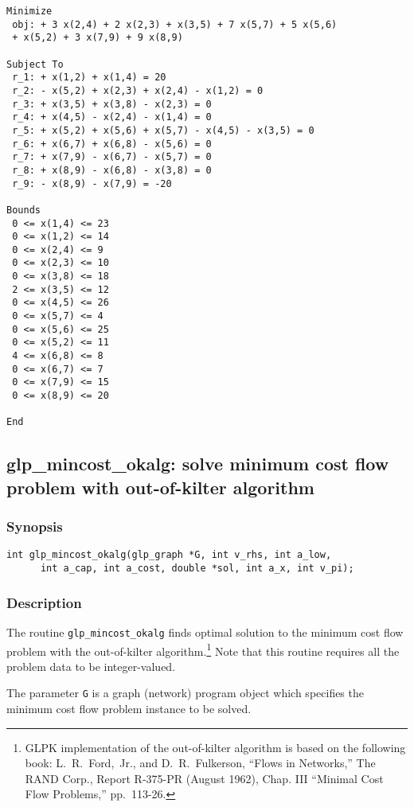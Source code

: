 \begin{verbatim}
Minimize
 obj: + 3 x(2,4) + 2 x(2,3) + x(3,5) + 7 x(5,7) + 5 x(5,6)
 + x(5,2) + 3 x(7,9) + 9 x(8,9)

Subject To
 r_1: + x(1,2) + x(1,4) = 20
 r_2: - x(5,2) + x(2,3) + x(2,4) - x(1,2) = 0
 r_3: + x(3,5) + x(3,8) - x(2,3) = 0
 r_4: + x(4,5) - x(2,4) - x(1,4) = 0
 r_5: + x(5,2) + x(5,6) + x(5,7) - x(4,5) - x(3,5) = 0
 r_6: + x(6,7) + x(6,8) - x(5,6) = 0
 r_7: + x(7,9) - x(6,7) - x(5,7) = 0
 r_8: + x(8,9) - x(6,8) - x(3,8) = 0
 r_9: - x(8,9) - x(7,9) = -20

Bounds
 0 <= x(1,4) <= 23
 0 <= x(1,2) <= 14
 0 <= x(2,4) <= 9
 0 <= x(2,3) <= 10
 0 <= x(3,8) <= 18
 2 <= x(3,5) <= 12
 0 <= x(4,5) <= 26
 0 <= x(5,7) <= 4
 0 <= x(5,6) <= 25
 0 <= x(5,2) <= 11
 4 <= x(6,8) <= 8
 0 <= x(6,7) <= 7
 0 <= x(7,9) <= 15
 0 <= x(8,9) <= 20

End
\end{verbatim}

\subsection{glp\_mincost\_okalg: solve minimum cost flow problem with
out-of-kilter algorithm}

\subsubsection*{Synopsis}

\begin{verbatim}
int glp_mincost_okalg(glp_graph *G, int v_rhs, int a_low,
      int a_cap, int a_cost, double *sol, int a_x, int v_pi);
\end{verbatim}

\subsubsection*{Description}

The routine \verb|glp_mincost_okalg| finds optimal solution to the
minimum cost flow problem with the out-of-kilter
algorithm.\footnote{GLPK implementation of the out-of-kilter algorithm
is based on the following book: L.~R.~Ford,~Jr., and D.~R.~Fulkerson,
``Flows in Networks,'' The RAND Corp., Report R-375-PR (August 1962),
Chap. III ``Minimal Cost Flow Problems,'' pp.~113-26.} Note that this
routine requires all the problem data to be integer-valued.

The parameter \verb|G| is a graph (network) program object which
specifies the minimum cost flow problem instance to be solved.

